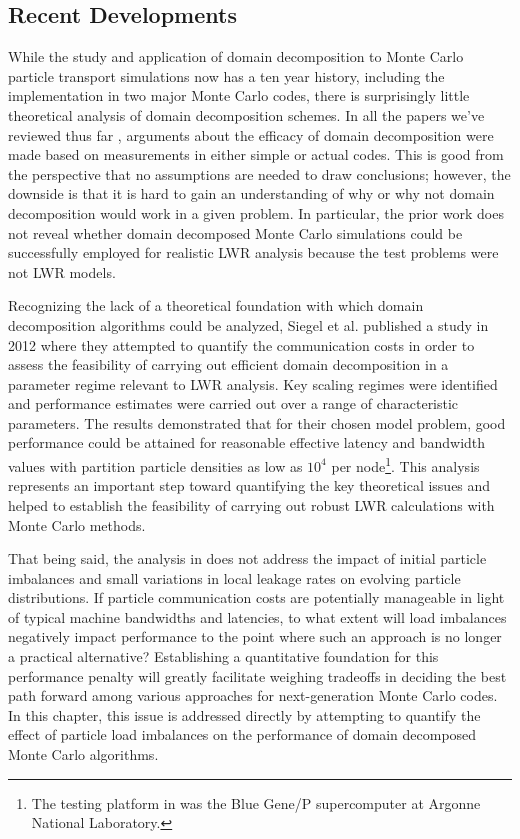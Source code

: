 \subsection{Recent Developments}

While the study and application of domain decomposition to Monte Carlo particle
transport simulations now has a ten year history, including the implementation
in two major Monte Carlo codes, there is surprisingly little theoretical
analysis of domain decomposition schemes. In all the papers we've reviewed thus
far \cite{js-alme-2001, mc-procassini-2005, mc-greenman-2009, jcp-brunner-2006,
  jcp-brunner-2009}, arguments about the efficacy of domain decomposition were
made based on measurements in either simple or actual codes. This is good from
the perspective that no assumptions are needed to draw conclusions; however, the
downside is that it is hard to gain an understanding of why or why not domain
decomposition would work in a given problem. In particular, the prior work does
not reveal whether domain decomposed Monte Carlo simulations could be
successfully employed for realistic LWR analysis because the test problems were
not LWR models.

Recognizing the lack of a theoretical foundation with which domain decomposition
algorithms could be analyzed, Siegel et al. published a study in 2012
\cite{jcp-siegel-2012-1} where they attempted to quantify the communication
costs in order to assess the feasibility of carrying out efficient domain
decomposition in a parameter regime relevant to LWR analysis. Key scaling
regimes were identified and performance estimates were carried out over a range
of characteristic parameters. The results demonstrated that for their chosen
model problem, good performance could be attained for reasonable effective
latency and bandwidth values with partition particle densities as low as $10^4$
per node\footnote{The testing platform in \cite{jcp-siegel-2012-1} was the Blue
  Gene/P supercomputer at Argonne National Laboratory.}. This analysis
represents an important step toward quantifying the key theoretical issues and
helped to establish the feasibility of carrying out robust LWR calculations with
Monte Carlo methods.

That being said, the analysis in \cite{jcp-siegel-2012-1} does not address the
impact of initial particle imbalances and small variations in local leakage
rates on evolving particle distributions. If particle communication costs are
potentially manageable in light of typical machine bandwidths and latencies, to
what extent will load imbalances negatively impact performance to the point
where such an approach is no longer a practical alternative? Establishing a
quantitative foundation for this performance penalty will greatly facilitate
weighing tradeoffs in deciding the best path forward among various approaches
for next-generation Monte Carlo codes. In this chapter, this issue is addressed
directly by attempting to quantify the effect of particle load imbalances on the
performance of domain decomposed Monte Carlo algorithms.

